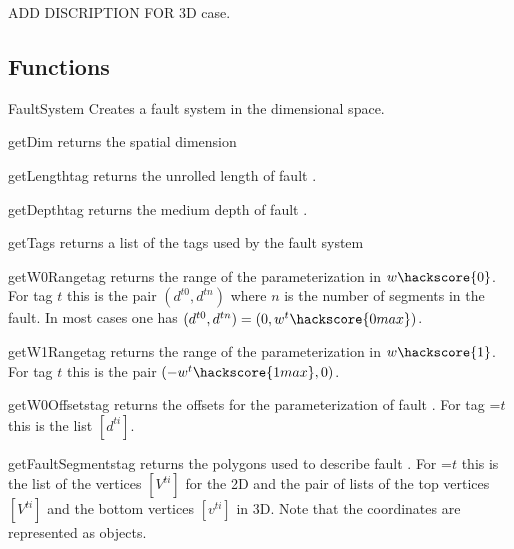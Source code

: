 ADD DISCRIPTION FOR 3D case.

\subsection{Functions}

\begin{classdesc}{FaultSystem}{
}
Creates a fault system in the  dimensional space.
\end{classdesc}



\begin{methoddesc}[FaultSystem]{getDim}{}
returns the spatial dimension
\end{methoddesc}
\begin{methoddesc}[FaultSystem]{getLength}{tag}
returns the unrolled length of fault .
\end{methoddesc}

\begin{methoddesc}[FaultSystem]{getDepth}{tag}
returns the medium depth of fault .
\end{methoddesc}

\begin{methoddesc}[FaultSystem]{getTags}{}
returns a list of the tags used by the fault system
\end{methoddesc}

\begin{methoddesc}[FaultSystem]{getW0Range}{tag}
returns the range of the parameterization in $w\hackscore{0}$.
For tag $t$ this is the pair $(d^{t0},d^{tn})$ where $n$ is the number of segments in the fault.
In most cases one has $(d^{t0},d^{tn})=(0,w^t\hackscore{0 max})$.
\end{methoddesc}

\begin{methoddesc}[FaultSystem]{getW1Range}{tag}
returns the range of the parameterization in  $w\hackscore{1}$.
For tag $t$ this is the pair $(-w^t\hackscore{1max},0)$.
\end{methoddesc}

\begin{methoddesc}[FaultSystem]{getW0Offsets}{tag}
returns the offsets for the parameterization of fault .
For tag =$t$ this is the list $[d^{ti}]$.
\end{methoddesc}


\begin{methoddesc}[FaultSystem]{getFaultSegments}{tag}
returns the polygons used to describe fault . For =$t$ this is the list of the vertices
$[V^{ti}]$ for the 2D and the pair of lists of the top vertices $[V^{ti}]$ and the bottom vertices  $[v^{ti}]$ in 3D.
Note that the coordinates are represented as \numpyNDA objects.
\end{methoddesc}

